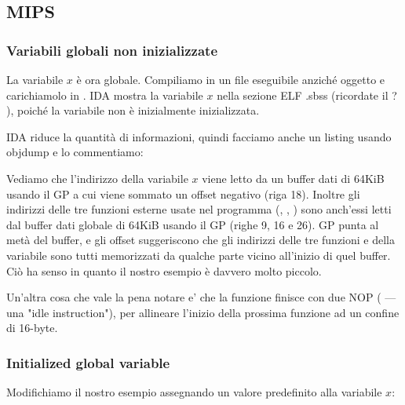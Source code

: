 \subsection{MIPS}

\subsubsection{Variabili globali non inizializzate}

La variabile $x$ è ora globale.
Compiliamo in un file eseguibile anziché oggetto e carichiamolo in \IDA.
IDA mostra la variabile $x$ nella sezione ELF .sbss (ricordate il ? ),
poiché la variabile non è inizialmente inizializzata.



IDA riduce la quantità di informazioni, quindi facciamo anche un listing usando objdump e lo commentiamo:



Vediamo che l'indirizzo della variabile $x$ viene letto da un buffer dati di 64KiB usando il GP a cui viene sommato un offset negativo (riga 18).
Inoltre gli indirizzi delle tre funzioni esterne usate nel programma (\puts, \scanf, \printf) sono anch'essi letti dal buffer dati globale di 64KiB usando il GP (righe 9, 16 e 26).
GP punta al metà del buffer, e gli offset suggeriscono che gli indirizzi delle tre funzioni e della variabile sono tutti memorizzati da qualche parte vicino all'inizio di quel buffer.
Ciò ha senso in quanto il nostro esempio è davvero molto piccolo.


Un'altra cosa che vale la pena notare e' che la funzione finisce con due \ac{NOP} ( --- una "idle instruction"), per allineare l'inizio della prossima funzione ad un confine di 16-byte.

\subsubsection{Initialized global variable}

Modifichiamo il nostro esempio assegnando un valore predefinito alla variabile $x$:



